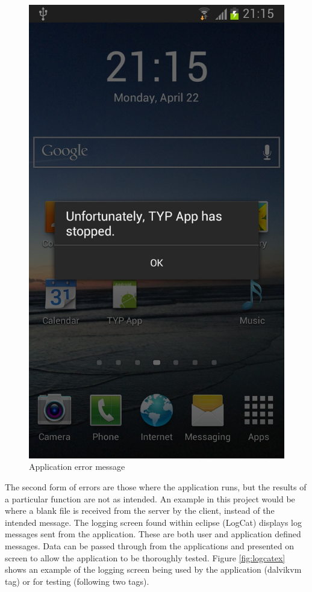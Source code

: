 \documentclass[a4paper,12pt]{report}
\begin{document}
\begin{figure}[htb]
 \centering
 \includegraphics[scale=0.2]{images/screenshots/appforceclose.jpg}
 \caption{Application error message}
 \label{fig:appforceclose}
\end{figure}

The second form of errors are those where the application runs, but the results of a particular function are not as intended. An example in this project would be where a blank file is received from the server by the client, instead of the intended message. The logging screen found within eclipse (LogCat) displays log messages sent from the application. These are both user and application defined messages. Data can be passed through from the applications and presented on screen to allow the application to be thoroughly tested. Figure \ref{fig:logcatex} shows an example of the logging screen being used by the application (dalvikvm tag) or for testing (following two tags).
\end{document}
